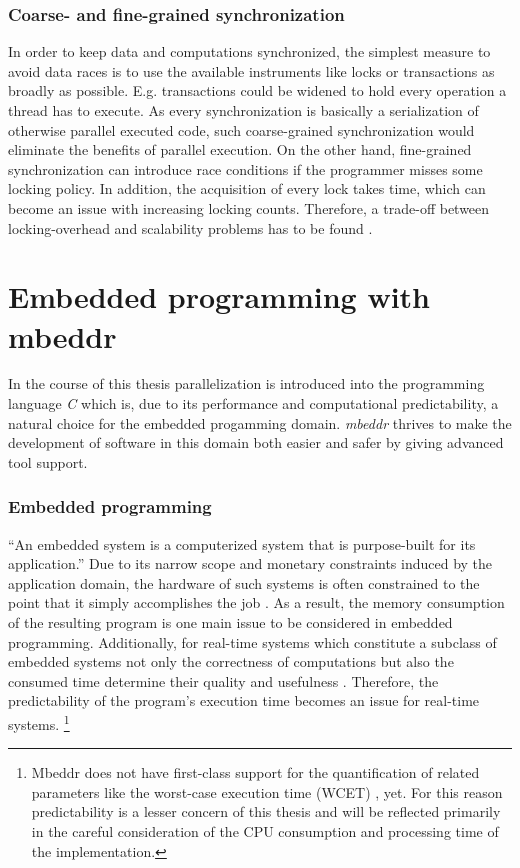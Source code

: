 \subsubsection{Coarse- and fine-grained synchronization}
In order to keep data and computations synchronized, the simplest measure to avoid data races is to use the available instruments like locks or transactions as broadly as possible. E.g. transactions could be widened to hold every operation a thread has to execute. As every synchronization is basically a serialization of otherwise parallel executed code, such coarse-grained synchronization would eliminate the benefits of parallel execution. On the other hand, fine-grained synchronization can introduce race conditions if the programmer misses some locking policy. In addition, the acquisition of every lock takes time, which can become an issue with increasing locking counts. Therefore, a trade-off between locking-overhead and scalability problems has to be found \cite[pp.~1-2]{PrinciplesOfTransactionalMemory}.


\section{Embedded programming with mbeddr}
In the course of this thesis parallelization is introduced into the programming language \textit{C} which is, due to its performance and computational predictability, a natural choice for the embedded progamming domain. \textit{mbeddr} thrives to make the development of software in this domain both easier and safer by giving advanced tool support. 

\subsubsection{Embedded programming}
``An embedded system is a computerized system that is purpose-built for its application.'' \cite[p.~1]{MakingEmbeddedSystems} Due to its narrow scope and monetary constraints induced by the application domain, the hardware of such systems is often constrained to the point that it simply accomplishes the job \cite{MakingEmbeddedSystems}. As a result, the memory consumption of the resulting program is one main issue to be considered in embedded programming. Additionally, for real-time systems which constitute a subclass of embedded systems not only the correctness of computations but also the consumed time determine their quality and usefulness \cite[pp.~1-2]{SoftReal-TimeSystems}. Therefore, the predictability of the program's execution time becomes an issue for real-time systems. \footnote{Mbeddr does not have first-class support for the quantification of related parameters like the worst-case execution time (WCET) \cite[p.~8]{SoftReal-TimeSystems}, yet. For this reason predictability is a lesser concern of this thesis and will be reflected primarily in the careful consideration of the CPU consumption and processing time of the implementation.}

